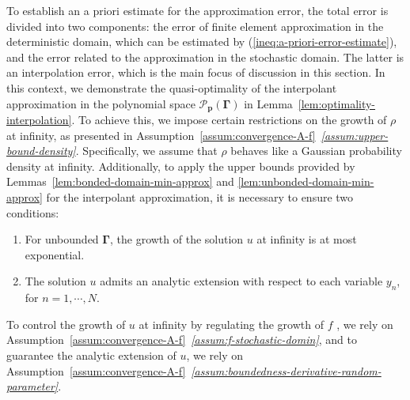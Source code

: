 \documentclass[final,onefignum,onetabnum]{mousaviart}
\begin{document}
	To establish an a priori estimate for the approximation error, the total error is divided into two components: the error of finite element approximation in the deterministic domain, which can be estimated by (\ref{ineq:a-priori-error-estimate}), and the error related to the approximation in the stochastic domain. The latter is an interpolation error, which is the main focus of discussion in this section.
	In this context, we demonstrate the quasi-optimality of the interpolant approximation in the polynomial space $\mathcal{P}_{\boldsymbol{p}}(\boldsymbol{\Gamma})$ in Lemma~\ref{lem:optimality-interpolation}. 
	To achieve this, we impose certain restrictions on the growth of $\rho$ at infinity, as presented in Assumption~\ref{assum:convergence-A-f}~\textit{\ref{assum:upper-bound-density}}. Specifically, we assume that $\rho$ behaves like a Gaussian probability density at infinity. Additionally, to apply the upper bounds provided by Lemmas~\ref{lem:bonded-domain-min-approx} and \ref{lem:unbonded-domain-min-approx} for the interpolant approximation, it is necessary to ensure two conditions:
	\begin{enumerate}
		\item 
		For unbounded $\boldsymbol{\Gamma}$, the growth of the solution $u$ at infinity is at most exponential.
		\item 
		The solution $u$ admits an analytic extension with respect to each variable $y_n$, for $n=1, \cdots, N$.
	\end{enumerate}
	To control the growth of $u$ at infinity by regulating the growth of $f$ , we rely on Assumption~\ref{assum:convergence-A-f}~\textit{\ref{assum:f-stochastic-domin}}, and to guarantee the analytic extension of $u$, we rely on Assumption~\ref{assum:convergence-A-f}~\textit{\ref{assum:boundedness-derivative-random-parameter}}.
\end{document}
